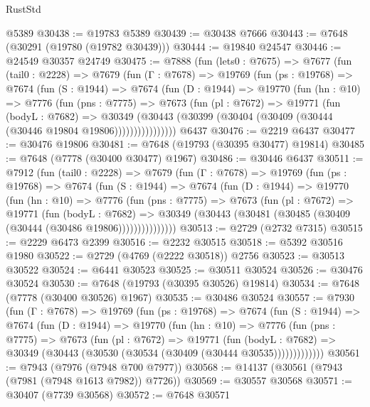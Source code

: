 \begin{lexlean}{RustStd}
\begin{coremodule}
    @5389
@30438 := @19783 @5389
@30439 := @30438 @7666
@30443 := @7648 (@30291 (@19780 (@19782 @30439)))
@30444 := @19840 @24547
@30446 := @24549 @30357 @24749
@30475 := @7888
    (fun (lets0 : @7675) =>
    @7677
      (fun (tail0 : @2228) =>
      @7679
        (fun (Γ : @7678) =>
        @19769
          (fun (ps : @19768) =>
          @7674
            (fun (S : @1944) =>
            @7674
              (fun (D : @1944) =>
              @19770
                (fun (hn : @10) =>
                @7776
                  (fun (pns : @7775) =>
                  @7673
                    (fun (pl : @7672) =>
                    @19771
                      (fun (bodyL : @7682) =>
                      @30349
                        (@30443
                          (@30399 (@30404 (@30409 (@30444 (@30446 @19804 @19806))))))))))))))))
    @6437
@30476 := @2219 @6437
@30477 := @30476 @19806
@30481 := @7648 (@19793 (@30395 @30477) @19814)
@30485 := @7648 (@7778 (@30400 @30477) @1967)
@30486 := @30446 @6437
@30511 := @7912
    (fun (tail0 : @2228) =>
    @7679
      (fun (Γ : @7678) =>
      @19769
        (fun (ps : @19768) =>
        @7674
          (fun (S : @1944) =>
          @7674
            (fun (D : @1944) =>
            @19770
              (fun (hn : @10) =>
              @7776
                (fun (pns : @7775) =>
                @7673
                  (fun (pl : @7672) =>
                  @19771
                    (fun (bodyL : @7682) =>
                    @30349 (@30443 (@30481 (@30485 (@30409 (@30444 (@30486 @19806)))))))))))))))
@30513 := @2729 (@2732 @7315)
@30515 := @2229 @6473 @2399
@30516 := @2232 @30515
@30518 := @5392 @30516 @1980
@30522 := @2729 (@4769 (@2222 @30518)) @2756
@30523 := @30513 @30522
@30524 := @6441 @30523
@30525 := @30511 @30524
@30526 := @30476 @30524
@30530 := @7648 (@19793 (@30395 @30526) @19814)
@30534 := @7648 (@7778 (@30400 @30526) @1967)
@30535 := @30486 @30524
@30557 := @7930
    (fun (Γ : @7678) =>
    @19769
      (fun (ps : @19768) =>
      @7674
        (fun (S : @1944) =>
        @7674
          (fun (D : @1944) =>
          @19770
            (fun (hn : @10) =>
            @7776
              (fun (pns : @7775) =>
              @7673
                (fun (pl : @7672) =>
                @19771
                  (fun (bodyL : @7682) =>
                  @30349 (@30443 (@30530 (@30534 (@30409 (@30444 @30535)))))))))))))
@30561 := @7943 (@7976 (@7948 @700 @7977))
@30568 := @14137 (@30561 (@7943 (@7981 (@7948 @1613 @7982)) @7726))
@30569 := @30557 @30568
@30571 := @30407 (@7739 @30568)
@30572 := @7648 @30571

\end{coremodule}
\end{lexlean}
